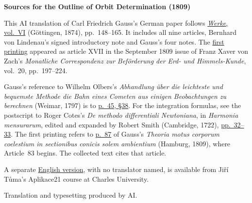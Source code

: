 \clearpage\thispagestyle{empty}
\begin{center}\textbf{Sources for the Outline of Orbit Determination (1809)}\end{center}
\noindent This AI translation of Carl Friedrich Gauss's German paper follows \href{https://gdz.sub.uni-goettingen.de/id/PPN236007467}{\textit{Werke}, vol.~VI} (Göttingen, 1874), pp.~148--165. It includes all nine articles, Bernhard von Lindenau's signed introductory note and Gauss's four notes. The \href{https://www.digitale-sammlungen.de/en/view/bsb10538610?page=203}{first printing} appeared as article XVII in the September 1809 issue of Franz Xaver von Zach's \textit{Monatliche Correspondenz zur Beförderung der Erd- und Himmels-Kunde}, vol.~20, pp.~197--224.
\par\smallskip\noindent Gauss's reference to Wilhelm Olbers's \textit{Abhandlung über die leichteste und bequemste Methode die Bahn eines Cometen aus einigen Beobachtungen zu berechnen} (Weimar, 1797) is to \href{https://www.e-rara.ch/zut/content/pageview/449839}{p.~45, §38}. For the integration formulas, see the postscript to Roger Cotes's \textit{De methodo differentiali Newtoniana}, in \textit{Harmonia mensurarum}, edited and expanded by Robert Smith (Cambridge, 1722), \href{https://www.e-rara.ch/zut/content/pageview/1256011}{pp.~32--33}. The first printing refers to \href{https://www.e-rara.ch/zut/content/pageview/142894}{p.~87} of Gauss's \textit{Theoria motus corporum coelestium in sectionibus conicis solem ambientium} (Hamburg, 1809), where Article~83 begins. The collected text cites that article.
\par\smallskip\noindent A separate \href{https://www2.karlin.mff.cuni.cz/~tuma/Aplikace21/ALL_Gauss_1809_Summarische.pdf}{English version}, with no translator named, is available from Jiří Tůma's Aplikace21 course at Charles University.
\par\smallskip\noindent Translation and typesetting produced by AI.
\clearpage
